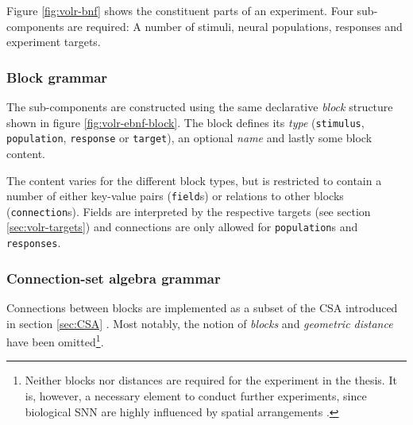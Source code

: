 Figure \ref{fig:volr-bnf} shows the constituent parts of an experiment.
Four sub-com\-po\-nents are required:
  A number of stimuli, neural populations, responses and experiment targets.

\subsubsection{Block grammar} \label{sec:volr-block}
The sub-components are constructed using the same declarative \textit{block}
structure shown in figure \ref{fig:volr-ebnf-block}.
The block defines its \textit{type} (\texttt{stimulus}, \texttt{population},
\texttt{response} or \texttt{target}), an optional \textit{name} and lastly
some block content.

The content varies for the different block types, but is restricted to contain
a number of either key-value pairs (\texttt{field}s) or relations to other
blocks (\texttt{connection}s).
Fields are interpreted by the respective targets (see section
\ref{sec:volr-targets}) and connections are only allowed for
\texttt{population}s and \texttt{responses}.

\subsubsection{Connection-set algebra grammar} \label{sec:volr-csa}
Connections between blocks are implemented as a subset of the \gls{CSA}
introduced in section \ref{sec:CSA} \autocite{Djurfeldt2012}.
Most notably, the notion of \textit{blocks} and \textit{geometric distance} have
been omitted\footnote{Neither blocks nor distances are required for the
  experiment in the thesis. It is, however, a necessary element to conduct
  further experiments, since biological \gls{SNN} are highly influenced by
  spatial arrangements \autocite{dayan2001}.
}.

